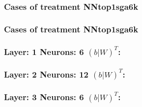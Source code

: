 \documentclass[18pt,c]{beamer}
\begin{document}
 \begin{frame}
 \fontsize{8pt}{9pt}\selectfont
 \frametitle{ Cases of treatment NNtop1sga6k }

 \label{ExpDSolutionTable015.tex}  
 \end{frame}

 \begin{frame}
 \fontsize{8pt}{9pt}\selectfont
 \frametitle{ Cases of treatment NNtop1sga6k }

 \label{ExpDSolutionTable016.tex}  
 \end{frame}


 \begin{frame}
 \fontsize{8pt}{9pt}\selectfont
 \frametitle{ Layer: 1 Neurons: 6  $(b|W)^T$: 
 }

 \label{ExpDNNWeightTable012.tex}  
 \end{frame}


 \begin{frame}
 \fontsize{8pt}{9pt}\selectfont
 \frametitle{ Layer: 2 Neurons: 12  $(b|W)^T$: 
 }

 \label{ExpDNNWeightTable013.tex}  
 \end{frame}


 \begin{frame}
 \fontsize{8pt}{9pt}\selectfont
 \frametitle{ Layer: 3 Neurons: 6  $(b|W)^T$: 
 }

 \label{ExpDNNWeightTable014.tex}  
 \end{frame}
\end{document}
